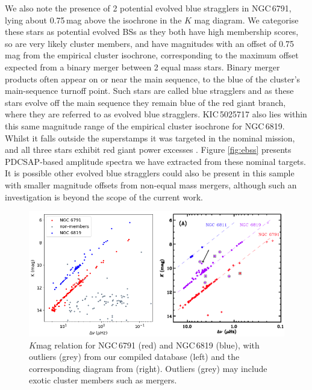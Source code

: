 We also note the presence of 2 potential evolved blue stragglers in NGC\,6791, lying about 0.75\,mag above the isochrone in the $K$ mag \textendash \dnu{} diagram. We categorise these stars as potential evolved BSs as they both have high membership scores, so are very likely cluster members, and have magnitudes with an offset of 0.75\,mag from the empirical cluster isochrone, corresponding to the maximum offset expected from a binary merger between 2 equal mass stars. Binary merger products often appear on or near the main sequence, to the blue of the cluster's main-sequence turnoff point. Such stars are called blue stragglers and as these stars evolve off the main sequence they remain blue of the red giant branch, where they are referred to as evolved blue stragglers. KIC\,5025717 also lies within this same magnitude range of the empirical cluster isochrone for NGC\,6819. Whilst it falls outside the \Kepler{} superstamps it was targeted in the nominal mission, and all three stars exhibit red giant power excesses \citep{yu_asteroseismology_2016}. Figure \ref{fig:ebss} presents PDCSAP-based amplitude spectra we have extracted from these nominal \Kepler{} targets. It is possible other evolved blue stragglers could also be present in this sample with smaller magnitude offsets from non-equal mass mergers, although such an investigation is beyond the scope of the current work.

\begin{figure}
    \centering
    \includegraphics[width=\linewidth]{Chapter5/kmag-dnu-both.png}
    \caption[$K$mag \textendash \dnu{} relation for NGC\,6791 and NGC\,6819]{$K$mag \textendash \dnu{} relation for NGC\,6791 (red) and NGC\,6819 (blue), with outliers (grey) from our compiled database (left) and the corresponding diagram from \citep{stello_asteroseismic_2011} (right). Outliers (grey) may include exotic cluster members such as mergers.}
    \label{fig:magdnu}
\end{figure}

